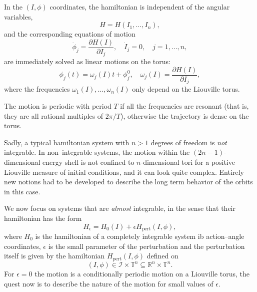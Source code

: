 \documentclass[english,fontsize=11pt,paper=b5]{scrbook}
\theoremstyle{definition}
\begin{document}
      In the $(I,\phi)$ coordinates, the hamiltonian is independent of the angular variables,
      \begin{equation}
        H = H(I_1, \ldots, I_n),
      \end{equation}
      and the corresponding equations of motion
      \begin{equation}
        \dot \phi_j = \frac{\partial H(I)}{\partial I_j}, \quad
        \dot I_j = 0, \quad
        j=1,\ldots,n,
      \end{equation}
      are immediately solved as linear motions on the torus:
      \begin{equation}
        \phi_j(t) = \omega_j(I) t + \phi_j^0, \quad \omega_j(I) = \frac{\partial H(I)}{\partial I_j},
      \end{equation}
      where the frequencies $\omega_1(I), \ldots, \omega_n(I)$ only depend on the Liouville torus.

      The motion is periodic with period $T$ if all the frequencies are resonant (that is, they are all rational multiples of $2\pi/T$), otherwise the trajectory is dense on the torus.

      Sadly, a typical hamiltonian system with $n>1$ degrees of freedom is \emph{not} integrable.
      In  non--integrable systems, the motion within the $(2n-1)$-dimensional energy shell is not confined to $n$-dimensional tori for a positive Liouville measure of initial conditions, and it can look quite complex.
      Entirely new notions had to be developed to describe the long term behavior of the orbits in this case.

      We now focus on systems that are \emph{almost} integrable, in the sense that their hamiltonian has the form
      \begin{equation}
        H_\epsilon = H_0(I) + \epsilon H_{\mathrm{pert}}(I,\phi),
      \end{equation}
      where $H_0$ is the hamiltonian of a completely integrable system ib action--angle coordinates, $\epsilon$ is the small parameter of the perturbation and the perturbation itself is given by the hamiltonian $H_{\mathrm{pert}}(I,\phi)$ defined on
      \begin{equation}
        (I,\phi) \in \mathcal{I} \times \mathbb{T}^n \subseteq \mathbb{R}^n\times\mathbb{T}^n.
      \end{equation}
      For $\epsilon=0$ the motion is a conditionally periodic motion on a Liouville torus, the quest now is to describe the nature of the motion for small values of $\epsilon$.
\end{document}
